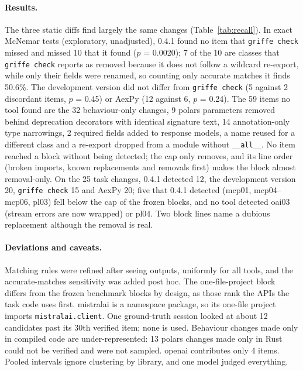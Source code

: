 \documentclass[11pt]{article}
\newcommand{\code}[1]{\texttt{#1}}
\begin{document}
\paragraph{Results.}
The three static diffs find largely the same changes (Table~\ref{tab:recall}). In exact McNemar tests (exploratory, unadjusted), 0.4.1 found no item that \code{griffe check} missed and missed 10 that it found ($p$ = 0.0020); 7 of the 10 are classes that \code{griffe check} reports as removed because it does not follow a wildcard re-export, while only their fields were renamed, so counting only accurate matches it finds 50.6\%. The development version did not differ from \code{griffe check} (5 against 2 discordant items, $p$ = 0.45) or AexPy (12 against 6, $p$ = 0.24). The 59 items no tool found are the 32 behaviour-only changes, 9 polars parameters removed behind deprecation decorators with identical signature text, 14 annotation-only type narrowings, 2 required fields added to response models, a name reused for a different class and a re-export dropped from a module without \code{\_\_all\_\_}.
No item reached a block without being detected; the cap only removes, and its line order (broken imports, known replacements and removals first) makes the block almost removal-only.
On the 25 task changes, 0.4.1 detected 12, the development version 20, \code{griffe check} 15 and AexPy 20; five that 0.4.1 detected (mcp01, mcp04--mcp06, pl03) fell below the cap of the frozen blocks, and no tool detected oai03 (stream errors are now wrapped) or pl04.
Two block lines name a dubious replacement although the removal is real.

\paragraph{Deviations and caveats.}
Matching rules were refined after seeing outputs, uniformly for all tools, and the accurate-matches sensitivity was added post hoc. The one-file-project block differs from the frozen benchmark blocks by design, as those rank the APIs the task code uses first. mistralai is a namespace package, so its one-file project imports \code{mistralai.client}. One ground-truth session looked at about 12 candidates past its 30th verified item; none is used. Behaviour changes made only in compiled code are under-represented: 13 polars changes made only in Rust could not be verified and were not sampled. openai contributes only 4 items. Pooled intervals ignore clustering by library, and one model judged everything.
\end{document}
